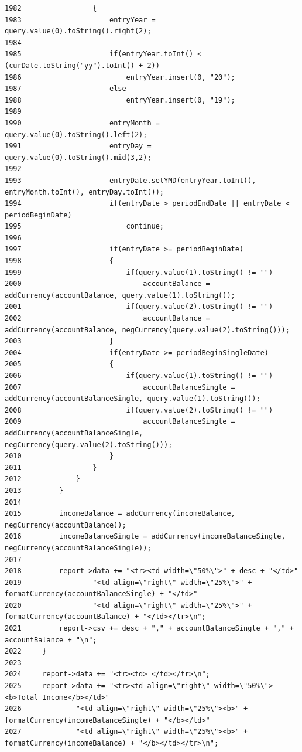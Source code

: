 \begin{verbatim}
1982                 {
1983                     entryYear = query.value(0).toString().right(2);
1984 
1985                     if(entryYear.toInt() < (curDate.toString("yy").toInt() + 2))
1986                         entryYear.insert(0, "20");
1987                     else
1988                         entryYear.insert(0, "19");
1989 
1990                     entryMonth = query.value(0).toString().left(2);
1991                     entryDay = query.value(0).toString().mid(3,2);
1992 
1993                     entryDate.setYMD(entryYear.toInt(), entryMonth.toInt(), entryDay.toInt());
1994                     if(entryDate > periodEndDate || entryDate < periodBeginDate)
1995                         continue;
1996 
1997                     if(entryDate >= periodBeginDate)
1998                     {
1999                         if(query.value(1).toString() != "")
2000                             accountBalance = addCurrency(accountBalance, query.value(1).toString());
2001                         if(query.value(2).toString() != "")
2002                             accountBalance = addCurrency(accountBalance, negCurrency(query.value(2).toString()));
2003                     }
2004                     if(entryDate >= periodBeginSingleDate)
2005                     {
2006                         if(query.value(1).toString() != "")
2007                             accountBalanceSingle = addCurrency(accountBalanceSingle, query.value(1).toString());
2008                         if(query.value(2).toString() != "")
2009                             accountBalanceSingle = addCurrency(accountBalanceSingle, negCurrency(query.value(2).toString()));
2010                     }
2011                 }
2012             }
2013         }
2014 
2015         incomeBalance = addCurrency(incomeBalance, negCurrency(accountBalance));
2016         incomeBalanceSingle = addCurrency(incomeBalanceSingle, negCurrency(accountBalanceSingle));
2017 
2018         report->data += "<tr><td width=\"50%\">" + desc + "</td>"
2019                 "<td align=\"right\" width=\"25%\">" + formatCurrency(accountBalanceSingle) + "</td>"
2020                 "<td align=\"right\" width=\"25%\">" + formatCurrency(accountBalance) + "</td></tr>\n";
2021         report->csv += desc + "," + accountBalanceSingle + "," + accountBalance + "\n";
2022     }
2023 
2024     report->data += "<tr><td> </td></tr>\n";
2025     report->data += "<tr><td align=\"right\" width=\"50%\"><b>Total Income</b></td>"
2026             "<td align=\"right\" width=\"25%\"><b>" + formatCurrency(incomeBalanceSingle) + "</b></td>"
2027             "<td align=\"right\" width=\"25%\"><b>" + formatCurrency(incomeBalance) + "</b></td></tr>\n";

\end{verbatim}
